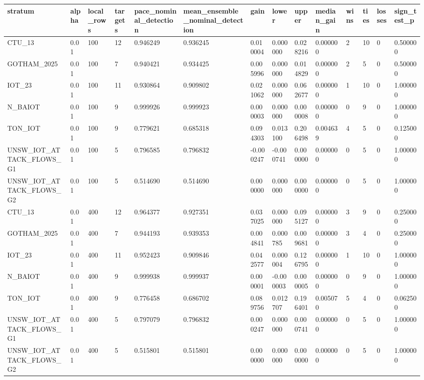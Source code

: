 \begin{tabular}{llllllllllllll}
\toprule
stratum & alpha & local\_rows & targets & pace\_nominal\_detection & mean\_ensemble\_nominal\_detection & gain & lower & upper & median\_gain & wins & ties & losses & sign\_test\_p \\
\midrule
CTU\_13 & 0.01 & 100 & 12 & 0.946249 & 0.936245 & 0.010004 & 0.000000 & 0.028216 & 0.000000 & 2 & 10 & 0 & 0.500000 \\
GOTHAM\_2025 & 0.01 & 100 & 7 & 0.940421 & 0.934425 & 0.005996 & 0.000000 & 0.014829 & 0.000000 & 2 & 5 & 0 & 0.500000 \\
IOT\_23 & 0.01 & 100 & 11 & 0.930864 & 0.909802 & 0.021062 & 0.000000 & 0.062677 & 0.000000 & 1 & 10 & 0 & 1.000000 \\
N\_BAIOT & 0.01 & 100 & 9 & 0.999926 & 0.999923 & 0.000003 & 0.000000 & 0.000008 & 0.000000 & 0 & 9 & 0 & 1.000000 \\
TON\_IOT & 0.01 & 100 & 9 & 0.779621 & 0.685318 & 0.094303 & 0.013100 & 0.206498 & 0.004639 & 4 & 5 & 0 & 0.125000 \\
UNSW\_IOT\_ATTACK\_FLOWS\_G1 & 0.01 & 100 & 5 & 0.796585 & 0.796832 & -0.000247 & -0.000741 & 0.000000 & 0.000000 & 0 & 5 & 0 & 1.000000 \\
UNSW\_IOT\_ATTACK\_FLOWS\_G2 & 0.01 & 100 & 5 & 0.514690 & 0.514690 & 0.000000 & 0.000000 & 0.000000 & 0.000000 & 0 & 5 & 0 & 1.000000 \\
CTU\_13 & 0.01 & 400 & 12 & 0.964377 & 0.927351 & 0.037025 & 0.000000 & 0.095127 & 0.000000 & 3 & 9 & 0 & 0.250000 \\
GOTHAM\_2025 & 0.01 & 400 & 7 & 0.944193 & 0.939353 & 0.004841 & 0.000785 & 0.009681 & 0.000000 & 3 & 4 & 0 & 0.250000 \\
IOT\_23 & 0.01 & 400 & 11 & 0.952423 & 0.909846 & 0.042577 & 0.000004 & 0.126795 & 0.000000 & 1 & 10 & 0 & 1.000000 \\
N\_BAIOT & 0.01 & 400 & 9 & 0.999938 & 0.999937 & 0.000001 & -0.000003 & 0.000005 & 0.000000 & 0 & 9 & 0 & 1.000000 \\
TON\_IOT & 0.01 & 400 & 9 & 0.776458 & 0.686702 & 0.089756 & 0.012707 & 0.196401 & 0.005070 & 5 & 4 & 0 & 0.062500 \\
UNSW\_IOT\_ATTACK\_FLOWS\_G1 & 0.01 & 400 & 5 & 0.797079 & 0.796832 & 0.000247 & 0.000000 & 0.000741 & 0.000000 & 0 & 5 & 0 & 1.000000 \\
UNSW\_IOT\_ATTACK\_FLOWS\_G2 & 0.01 & 400 & 5 & 0.515801 & 0.515801 & 0.000000 & 0.000000 & 0.000000 & 0.000000 & 0 & 5 & 0 & 1.000000 \\

\end{tabular}
